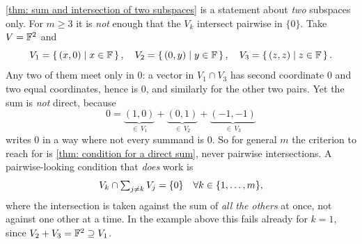 \begin{ainote}[Trap]
  \ref{thm: sum and intersection of two subspaces} is a statement about \emph{two} subspaces only. For $m \geq 3$ it is \emph{not} enough that the $V_k$ intersect pairwise in $\{0\}$. Take $V = \mathbb{F}^2$ and
  \begin{equation}
    V_1 = \left\{ \, (x,0) \mid x \in \mathbb{F} \,\right\}, \quad
    V_2 = \left\{ \, (0,y) \mid y \in \mathbb{F} \,\right\}, \quad
    V_3 = \left\{ \, (z,z) \mid z \in \mathbb{F} \,\right\}.
  \end{equation}
  Any two of them meet only in $0$: a vector in $V_1 \cap V_3$ has second coordinate $0$ and two equal coordinates, hence is $0$, and similarly for the other two pairs. Yet the sum is \emph{not} direct, because
  \begin{equation}
    0 = \underbrace{(1,0)}_{\in \, V_1} + \underbrace{(0,1)}_{\in \, V_2} + \underbrace{(-1,-1)}_{\in \, V_3}
  \end{equation}
  writes $0$ in a way where not every summand is $0$. So for general $m$ the criterion to reach for is \ref{thm: condition for a direct sum}, never pairwise intersections. A pairwise-looking condition that \emph{does} work is
  \begin{equation}
    \textstyle V_k \cap \sum_{j \neq k} V_j = \{0\} \quad \forall k \in \{1, \dots, m \},
  \end{equation}
  where the intersection is taken against the sum of \emph{all the others} at once, not against one other at a time. In the example above this fails already for $k=1$, since $V_2 + V_3 = \mathbb{F}^2 \supseteq V_1$.
\end{ainote}
